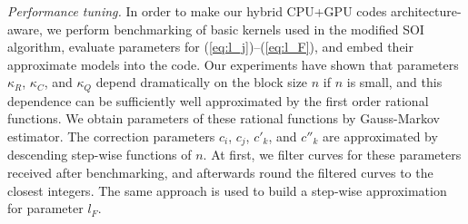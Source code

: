 \documentclass{llncs}
\begin{document}
\textit%
{Performance tuning.} %
\label{sec:BB_performance}
%
In order to make our hybrid CPU+GPU codes architecture-aware, 
we perform benchmarking of basic kernels used in the modified SOI algorithm, 
evaluate parameters for (\ref{eq:l_j})--(\ref{eq:l_F}), 
and embed their approximate models into the code.
% 
Our experiments have shown that 
parameters $\kappa_R$, $\kappa_C$, and $\kappa_Q$ 
depend dramatically on the block size $n$ if $n$ is small, and
this dependence can be sufficiently well
approximated by the first order rational functions. 
We obtain parameters of these rational functions 
by Gauss-Markov estimator. 
% 
The correction parameters $c_i$, $c_j$, $c'_k$, and $c''_k$ %
are approximated by descending step-wise functions of $n$.
At first, we filter curves for these parameters received after benchmarking, %
and afterwards round the filtered curves to the closest integers.
The same approach is used to build a step-wise approximation for parameter $l_F$.
\end{document}
